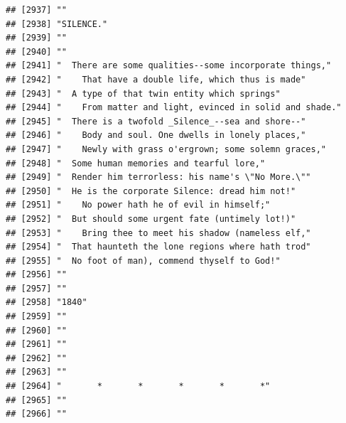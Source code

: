 \documentclass{article}\usepackage[]{graphicx}\usepackage[]{color}
\makeatletter
\newenvironment{kframe}{%
 \def\at@end@of@kframe{}%
 \ifinner\ifhmode%
  \def\at@end@of@kframe{\end{minipage}}%
  \begin{minipage}{\columnwidth}%
 \fi\fi%
 \def\FrameCommand##1{\hskip\@totalleftmargin \hskip-\fboxsep
 \colorbox{shadecolor}{##1}\hskip-\fboxsep
     \hskip-\linewidth \hskip-\@totalleftmargin \hskip\columnwidth}%
 \MakeFramed {\advance\hsize-\width
   \@totalleftmargin\z@ \linewidth\hsize
   \@setminipage}}%
 {\par\unskip\endMakeFramed%
 \at@end@of@kframe}
\newenvironment{knitrout}{}{} %
\makeatother
\begin{document}
\begin{knitrout}
\begin{kframe}
\begin{verbatim}
## [2937] ""                                                                            
## [2938] "SILENCE."                                                                    
## [2939] ""                                                                            
## [2940] ""                                                                            
## [2941] "  There are some qualities--some incorporate things,"                        
## [2942] "    That have a double life, which thus is made"                             
## [2943] "  A type of that twin entity which springs"                                  
## [2944] "    From matter and light, evinced in solid and shade."                      
## [2945] "  There is a twofold _Silence_--sea and shore--"                             
## [2946] "    Body and soul. One dwells in lonely places,"                             
## [2947] "    Newly with grass o'ergrown; some solemn graces,"                         
## [2948] "  Some human memories and tearful lore,"                                     
## [2949] "  Render him terrorless: his name's \"No More.\""                            
## [2950] "  He is the corporate Silence: dread him not!"                               
## [2951] "    No power hath he of evil in himself;"                                    
## [2952] "  But should some urgent fate (untimely lot!)"                               
## [2953] "    Bring thee to meet his shadow (nameless elf,"                            
## [2954] "  That haunteth the lone regions where hath trod"                            
## [2955] "  No foot of man), commend thyself to God!"                                  
## [2956] ""                                                                            
## [2957] ""                                                                            
## [2958] "1840"                                                                        
## [2959] ""                                                                            
## [2960] ""                                                                            
## [2961] ""                                                                            
## [2962] ""                                                                            
## [2963] ""                                                                            
## [2964] "       *       *       *       *       *"                                    
## [2965] ""                                                                            
## [2966] ""                                                                            

\end{verbatim}
\end{kframe}
\end{knitrout}
\end{document}

